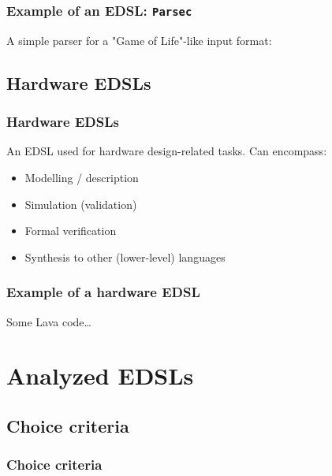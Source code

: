\documentclass{beamer}
\begin{document}
            \begin{frame}[fragile]
                \frametitle{Example of an EDSL: \texttt{Parsec}}

                A simple parser for a "Game of Life"-like input format:
\end{frame}


        \subsection{Hardware EDSLs}
        \label{subsec:hardware-edsls}
            \begin{frame}
                \frametitle{Hardware EDSLs}
                An EDSL used for hardware design-related tasks. Can encompass:

                \begin{itemize}
                    \item Modelling / description
                    \item Simulation (validation)
                    \item Formal verification
                    \item Synthesis to other (lower-level) languages
                \end{itemize}
            \end{frame}

            \begin{frame}
                \frametitle{Example of a hardware EDSL}

                Some Lava code\ldots
            \end{frame}



    \section{Analyzed EDSLs}
    \label{sec:analyzed-edsls}
        \frame{\sectionpage}

        \subsection{Choice criteria}
        \label{subsec:edsls-choice-criteria}
            \begin{frame}
                \frametitle{Choice criteria}
            \end{frame}
\end{document}
